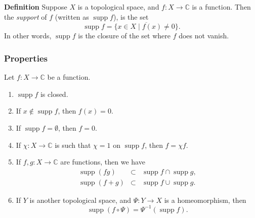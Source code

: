 \documentclass[12pt]{article}
\newcommand{\sC}[0]{\mathbb{C}}
\begin{document}
\newcommand{\supp}[0]{\operatorname{supp}}

{\bf Definition}
Suppose $X$ is a topological space, and $f\colon X\to \sC$ is a function.
Then the \emph{support} of $f$ (written as $\supp f$), is the set
$$ 
  \supp f = \overline{\{x\in X\mid f(x)\neq 0\}}.
$$
In other words, $\supp f$ is the closure of the set where $f$
does not vanish.

\subsubsection*{Properties}
Let $f\colon X\to \sC$ be a function. 
\begin{enumerate}
\item $\supp f$ is closed.
\item If $x\notin \supp f$, then $f(x)=0$. 
\item If $\supp f = \emptyset$, then $f=0$. 
\item If $\chi\colon X\to \sC$ is such that $\chi = 1$ on $\supp f$, then
$f=\chi f$. 
\item If $f,g\colon X\to \sC$ are functions, then we have
\begin{eqnarray*}
\supp (fg) &\subset & \supp f \cap \supp g, \\
\supp (f+g) &\subset & \supp f \cup \supp g.
\end{eqnarray*}
\item If $Y$ is another topological space, and $\Psi\colon Y\to X$ is a 
homeomorphism, then 
$$ 
  \supp (f\circ \Psi) = \Psi^{-1}(\supp f).
$$
\end{enumerate}
\end{document}
